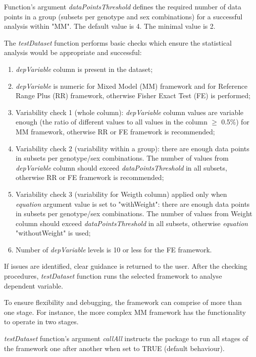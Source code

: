 \documentclass[12pt,a4paper]{article}
\begin{document}
Function's argument \textit{dataPointsThreshold} defines the required number of data points in a group (subsets per genotype and sex combinations) for a successful analysis within "MM". The default value is 4. The minimal value is 2.

The \textit{testDataset} function performs basic checks which ensure the statistical analysis would be appropriate and successful:
\begin{enumerate}
\item \textit{depVariable} column is present in the dataset;
\item \textit{depVariable} is numeric for Mixed Model (MM) framework and for Reference Range Plus (RR) framework, otherwise Fisher Exact Test (FE) is performed;
\item Variability check 1 (whole column): \textit{depVariable} column values are variable enough (the ratio of different values to all values in the column $\geq$ 0.5\%) for MM framework, otherwise RR or FE framework is recommended;
\item Variability check 2 (variability within a group): there are enough data points in subsets per genotype/sex combinations. The number of values from \textit{depVariable} column should exceed \textit{dataPointsThreshold} in all subsets, otherwise RR or FE framework is recommended;
\item Variability check 3 (variability for Weigth column) applied only when \textit{equation} argument value is set to "withWeight": there are enough data points in subsets per genotype/sex combinations. The number of values from Weight column should exceed \textit{dataPointsThreshold} in all subsets, otherwise \textit{equation} "withoutWeight" is used;
\item Number of \textit{depVariable} levels is 10 or less for the FE framework.
\end{enumerate}

If issues are identified, clear guidance is returned to the user. 
After the checking procedures, \textit{testDataset} function runs the selected framework to analyse dependent variable. 

To ensure flexibility and debugging, the framework can comprise of more than one stage. For instance, the more complex MM framework has the functionality to operate in two stages.

\textit{testDataset} function's argument \textit{callAll} instructs the package to run all stages of the framework one after another when set to TRUE (default behaviour). 
\end{document}
